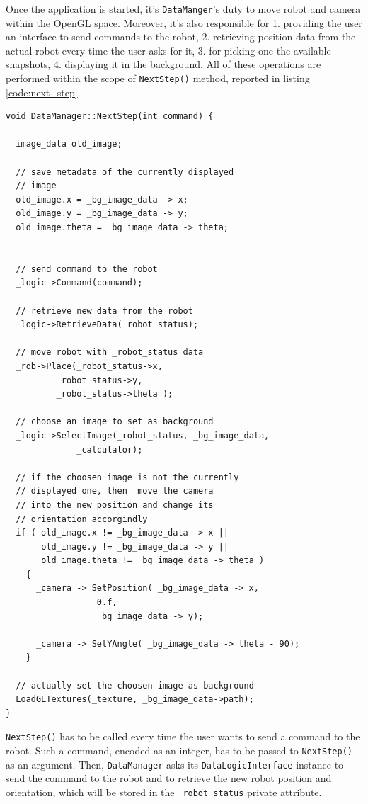 %
Once the application is started, it's \texttt{DataManger}'s duty 
to move robot and camera within the OpenGL space. Moreover, 
it's also responsible for 1. providing the user an interface 
to send commands to the robot, 2. retrieving position 
data from the actual robot every time the user asks 
for it, 3. for picking one the available snapshots, 
4. displaying it in the background. 
%
All of these operations are performed within the 
scope of \texttt{NextStep()} method, reported in 
listing \ref{code:next_step}.
%
\begin{lstlisting}[caption={The \texttt{DataManager::NextStep()} method}, label={code:next_step}, frame=trBL]
void DataManager::NextStep(int command) {

  image_data old_image;

  // save metadata of the currently displayed 
  // image
  old_image.x = _bg_image_data -> x;
  old_image.y = _bg_image_data -> y;
  old_image.theta = _bg_image_data -> theta;


  // send command to the robot
  _logic->Command(command);

  // retrieve new data from the robot
  _logic->RetrieveData(_robot_status);

  // move robot with _robot_status data
  _rob->Place(_robot_status->x,
	      _robot_status->y,
	      _robot_status->theta ); 

  // choose an image to set as background
  _logic->SelectImage(_robot_status, _bg_image_data,
		      _calculator);

  // if the choosen image is not the currently
  // displayed one, then  move the camera
  // into the new position and change its 
  // orientation accorgindly
  if ( old_image.x != _bg_image_data -> x ||
       old_image.y != _bg_image_data -> y ||
       old_image.theta != _bg_image_data -> theta )
    {
      _camera -> SetPosition( _bg_image_data -> x,
			      0.f,
			      _bg_image_data -> y);
      
      _camera -> SetYAngle( _bg_image_data -> theta - 90);
    }

  // actually set the choosen image as background
  LoadGLTextures(_texture, _bg_image_data->path);
}
\end{lstlisting}
%
\texttt{NextStep()} has to be called every time 
the user wants to send a command to the robot. 
%
Such a command, encoded as an integer, has to be passed to 
\texttt{NextStep()} as an argument.
%
Then, \texttt{DataManager} asks its \texttt{DataLogicInterface} 
instance to send the command to the robot and to 
retrieve the new robot position and orientation, which will be 
stored in the \texttt{\_robot\_status} private attribute.
%

